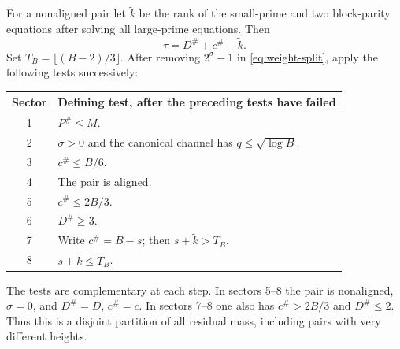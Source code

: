For a nonaligned pair let $\widetilde k$ be the rank of the small-prime
and two block-parity equations after solving all large-prime equations.
Then
\begin{equation}\label{macro:lem:exact-rank}
 \tau=D^\#+c^\#-\widetilde k.
\end{equation}
Set $T_B=\lfloor(B-2)/3\rfloor$. After removing $2^\sigma-1$ in
\eqref{eq:weight-split}, apply the following tests successively:
\begin{center}\small
\begin{tabularx}{\textwidth}{@{}cX@{}}\toprule
Sector & Defining test, after the preceding tests have failed\\\midrule
1 & $P^\#\le M$.\\
2 & $\sigma>0$ and the canonical channel has $q\le\sqrt{\log B}$.\\
3 & $c^\#\le B/6$.\\
4 & The pair is aligned.\\
5 & $c^\#\le2B/3$.\\
6 & $D^\#\ge3$.\\
7 & Write $c^\#=B-s$; then $s+\widetilde k>T_B$.\\
8 & $s+\widetilde k\le T_B$.\\\bottomrule
\end{tabularx}
\end{center}
The tests are complementary at each step. In sectors 5--8 the pair is
nonaligned, $\sigma=0$, and $D^\#=D$, $c^\#=c$. In sectors 7--8 one
also has $c^\#>2B/3$ and $D^\#\le2$. Thus this is a disjoint partition
of all residual mass, including pairs with very different heights.

